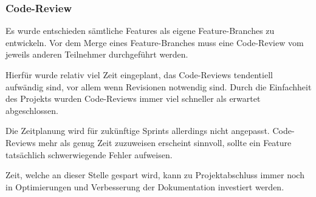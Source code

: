 \subsubsection*{Code-Review}
Es wurde entschieden sämtliche Features als eigene Feature-Branches zu entwickeln. Vor dem Merge eines Feature-Branches muss eine Code-Review vom jeweils anderen Teilnehmer durchgeführt werden.

Hierfür wurde relativ viel Zeit eingeplant, das Code-Reviews tendentiell aufwändig sind, vor allem wenn Revisionen notwendig sind. Durch die Einfachheit des Projekts wurden Code-Reviews immer viel schneller als erwartet abgeschlossen.

Die Zeitplanung wird für zukünftige Sprints allerdings nicht angepasst. Code-Reviews mehr als genug Zeit zuzuweisen erscheint sinnvoll, sollte ein Feature tatsächlich schwerwiegende Fehler aufweisen.

Zeit, welche an dieser Stelle gespart wird, kann zu Projektabschluss immer noch in Optimierungen und Verbesserung der Dokumentation investiert werden.
